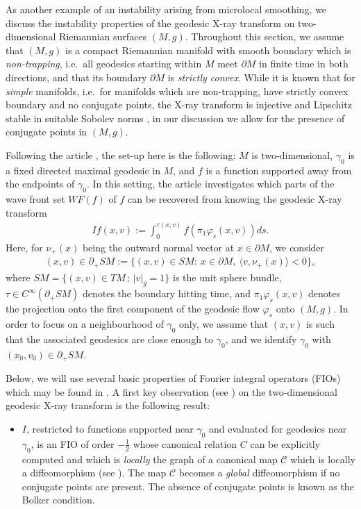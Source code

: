 \documentclass[12pt,twoside]{amsart}
\numberwithin{equation}{section}
\newcommand {\p} {\partial}
\newcommand{\abs}[1]{\lvert #1 \rvert}          %
\begin{document}
As another example of an instability arising from microlocal smoothing, we discuss the instability properties of the geodesic X-ray transform on two-dimensional Riemannian surfaces $(M,g)$. Throughout this section, we assume that $(M,g)$ is a compact Riemannian manifold with smooth boundary which is \emph{non-trapping}, i.e.\ all geodesics starting within $M$ meet $\partial M$ in finite time in both directions, and that its boundary $\partial M$ is \emph{strictly convex}. While it is known that for \emph{simple} manifolds, i.e.\ for manifolds which are non-trapping, have strictly convex boundary and no conjugate points, the X-ray transform is injective and Lipschitz stable in suitable Sobolev norms \cite{SU04, AS20}, in our discussion we allow for the presence of conjugate points in $(M,g)$. 

Following the article \cite{MSU15}, the set-up here is the following: $M$ is two-dimensional, $\gamma_0$ is a fixed directed maximal geodesic in $M$, and $f $ is a function supported away from the endpoints of $\gamma_0$. In this setting, the article \cite{MSU15} investigates which parts of the wave front set $WF(f)$ of $f$ can be recovered from knowing the geodesic X-ray transform 
\begin{align*}
I f (x,v):= \int_0^{\tau(x,v)} f(\pi_1 \varphi_s(x,v)) ds.
\end{align*}
Here, for $\nu_+(x)$ being the outward normal vector at $x\in \partial M$, we consider   
\begin{align*}
(x,v) \in \partial_+ SM:=\{(x,v)\in SM: \ x \in \partial M, \ \langle v, \nu_+(x) \rangle < 0 \},
\end{align*}
where $SM = \{ (x,v) \in TM \,;\, \abs{v}_g = 1 \}$ is the unit sphere bundle, $\tau \in C^{\infty}(\partial_+ SM)$ denotes the boundary hitting time, and $\pi_1 \varphi_s(x,v)$ denotes the projection onto the first component of the geodesic flow $\varphi_s$ onto $(M,g)$. In order to focus on a neighbourhood of $\gamma_0$ only, we assume that $(x,v)$ is such that the associated geodesics are close enough to $\gamma_0$, and we identify $\gamma_0$ with $(x_0,v_0)\in \p_+ SM$. 

Below, we will use several basic properties of Fourier integral operators (FIOs) which may be found in \cite[Chapter 25]{Hoermander}. A first key observation (see \cite[Proposition 3.1 and Theorem 3.2]{MSU15}) on the two-dimensional geodesic X-ray transform is the following result:

\begin{itemize}
\item[(i)] $I$, restricted to functions supported near $\gamma_0$ and evaluated for geodesics near $\gamma_0$, is an FIO of order $-\frac{1}{2}$ whose canonical relation $C$ can be explicitly computed and which is \emph{locally} the graph of a canonical map $\mathcal{C}$ which is locally a diffeomorphism (see \cite[Theorem 3.2]{MSU15}). The map $\mathcal{C}$ becomes a \emph{global} diffeomorphism if no conjugate points are present. The absence of conjugate points is known as the Bolker condition.
\end{itemize}
\end{document}

